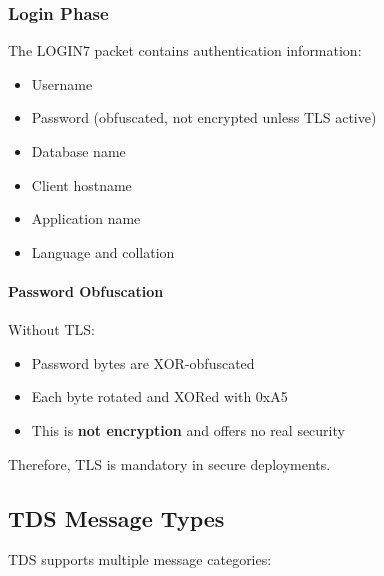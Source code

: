 \subsubsection{Login Phase}

The LOGIN7 packet contains authentication information:

\begin{itemize}
    \item Username
    \item Password (obfuscated, not encrypted unless TLS active)
    \item Database name
    \item Client hostname
    \item Application name
    \item Language and collation
\end{itemize}

\paragraph{Password Obfuscation}

Without TLS:
\begin{itemize}
    \item Password bytes are XOR-obfuscated
    \item Each byte rotated and XORed with 0xA5
    \item This is \textbf{not encryption} and offers no real security
\end{itemize}

Therefore, TLS is mandatory in secure deployments.

\subsection{TDS Message Types}

TDS supports multiple message categories:

